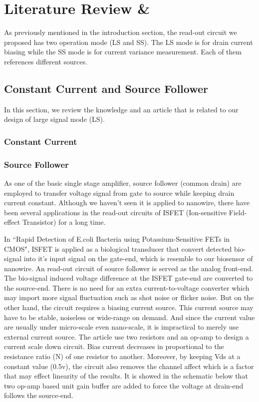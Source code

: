 \chapter{Literature Review \&}
As previously mentioned in the introduction section, the read-out circuit we proposed has two operation mode (LS and SS).
The LS mode is for drain current biasing while the SS mode is for current variance measurement.
Each of them references different sources.

\section{Constant Current and Source Follower}
In this section, we review the knowledge and an article that is related to our design of large signal mode (LS).

\subsection{Constant Current}


\subsection{Source Follower}
As one of the basic single stage amplifier, source follower (common drain) are employed to transfer voltage signal from gate to source while keeping drain current constant.
Although we haven't seen it is applied to nanowire, there have been several applications in the read-out circuits of ISFET (Ion-sensitive Field-effect Transistor)\cite{SF1, SF2} for a long time.

In ``Rapid Detection of E.coli Bacteria using Potassium-Sensitive FETs in CMOS", ISFET is applied as a biological transducer that convert detected bio-signal into it's input signal on the gate-end, which is resemble to our biosensor of nanowire.
An read-out circuit of source follower is served as the analog front-end.
The bio-signal induced voltage difference at the ISFET gate-end are converted to the source-end.
There is no need for an extra current-to-voltage converter which may import more signal fluctuation such as shot noise or flicker noise.
But on the other hand, the circuit requires a biasing current source.
This current source may have to be stable, noiseless or wide-range on demand.
And since the current value are usually under micro-scale even nano-scale, it is impractical to merely use external current source.
The article use two resistors and an op-amp to design a current scale down circuit.
Bias current decreases in proportional to the resistance ratio (N) of one resistor to another.
Moreover, by keeping Vds at a constant value (0.5v), the circuit also removes {\color{red}the channel affect which is a factor that may effect linearity of the results.}
It is showed in the schematic below that two op-amp based unit gain buffer are added to force the voltage at drain-end follows the source-end.

